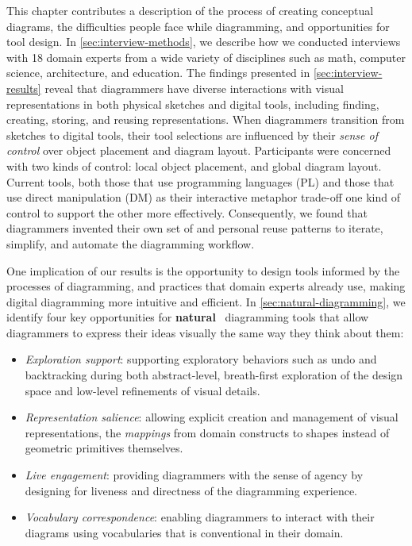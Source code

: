 This chapter contributes a description of the process of creating conceptual diagrams, the difficulties people face while diagramming, and opportunities for tool design. In \cref{sec:interview-methods}, we describe how we conducted interviews with 18 domain experts from a wide variety of disciplines such as math, computer science, architecture, and education. The findings presented in \cref{sec:interview-results} reveal that diagrammers have diverse interactions with visual representations in both physical sketches and digital tools, including finding, creating, storing, and reusing representations. When diagrammers transition from sketches to digital tools, their tool selections are influenced by their \emph{sense of control} over object placement and diagram layout. Participants were concerned with two kinds of control: local object placement, and global diagram layout. Current tools, both those that use programming languages (PL) and those that use direct manipulation (DM) as their interactive metaphor trade-off one kind of control to support the other more effectively. Consequently, we found that diagrammers invented their own set of  and personal reuse patterns to iterate, simplify, and automate the diagramming workflow. 

One implication of our results is the opportunity to design tools informed by the processes of diagramming, and practices that domain experts already use, making digital diagramming more intuitive and efficient. In \cref{sec:natural-diagramming}, we identify four key opportunities for \textbf{natural}~\cite{myers_natural_2004} diagramming tools that allow diagrammers to express their ideas visually the same way they think about them:

\begin{itemize} 
    \item \textit{Exploration support}: supporting exploratory behaviors such as undo and backtracking during both abstract-level, breath-first exploration of the design space and low-level refinements of visual details.
    \item \textit{Representation salience}: allowing explicit creation and management of visual representations, \ie{} the \emph{mappings} from domain constructs to shapes instead of geometric primitives themselves.
    \item \textit{Live engagement}: providing diagrammers with the sense of agency by designing for liveness and directness of the diagramming experience. 
    \item \textit{Vocabulary correspondence}: enabling diagrammers to interact with their diagrams using vocabularies that is conventional in their domain.
\end{itemize}

